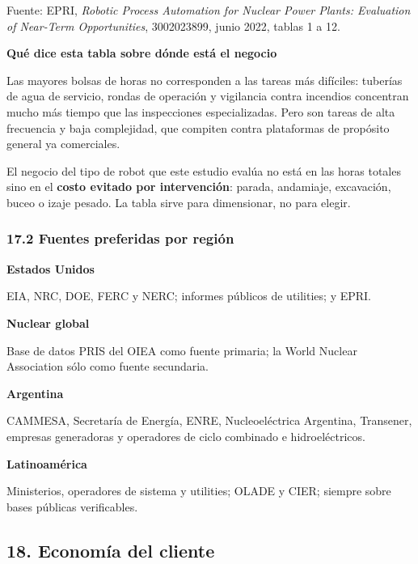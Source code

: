 \documentclass[11pt,a4paper]{article}
\newcommand{\badge}[3]{%
  \tcbox[on line, boxsep=1pt, left=2pt, right=2pt, top=0.5pt, bottom=0.5pt,
         colback=#1, colframe=#1, arc=1pt, boxrule=0pt]%
    {\color{#2}\sffamily\scriptsize\bfseries #3}}
\newenvironment{notainferencia}[1]
  {\begin{notainferenciabase}{\sffamily\scriptsize\bfseries\color{green}#1}\par\vspace{2pt}}
  {\end{notainferenciabase}}
\newenvironment{tarjeta}[2]
  {\begin{tarjetabase}%
   {\sffamily\bfseries\color{navy}#1}%
   \ifstrempty{#2}{}{\\[1pt]{\sffamily\scriptsize\color{gray2}#2}}%
   \par\vspace{3pt}}
  {\end{tarjetabase}}
\begin{document}
Fuente: EPRI, \emph{Robotic Process Automation for Nuclear Power Plants: Evaluation of Near-Term Opportunities}, 3002023899, junio 2022, tablas 1 a 12. \badge{navy}{white}{A}

\begin{notainferencia}{Qué dice esta tabla sobre dónde está el negocio}
Las mayores bolsas de horas no corresponden a las tareas más difíciles: tuberías de agua de servicio, rondas de operación y vigilancia contra incendios concentran mucho más tiempo que las inspecciones especializadas. Pero son tareas de alta frecuencia y baja complejidad, que compiten contra plataformas de propósito general ya comerciales.

El negocio del tipo de robot que este estudio evalúa no está en las horas totales sino en el \textbf{costo evitado por intervención}: parada, andamiaje, excavación, buceo o izaje pesado. La tabla sirve para dimensionar, no para elegir.

\end{notainferencia}

\subsubsection*{17.2 Fuentes preferidas por región}

\begin{tarjeta}{Estados Unidos}{}
EIA, NRC, DOE, FERC y NERC; informes públicos de utilities; y EPRI.

\end{tarjeta}
\begin{tarjeta}{Nuclear global}{}
Base de datos PRIS del OIEA como fuente primaria; la World Nuclear Association sólo como fuente secundaria.

\end{tarjeta}
\begin{tarjeta}{Argentina}{}
CAMMESA, Secretaría de Energía, ENRE, Nucleoeléctrica Argentina, Transener, empresas generadoras y operadores de ciclo combinado e hidroeléctricos.

\end{tarjeta}
\begin{tarjeta}{Latinoamérica}{}
Ministerios, operadores de sistema y utilities; OLADE y CIER; siempre sobre bases públicas verificables.

\end{tarjeta}

\subsection*{18. Economía del cliente}
\end{document}
